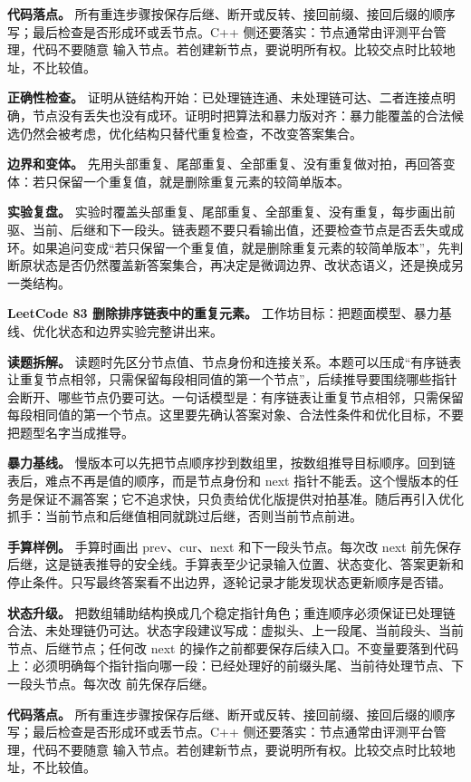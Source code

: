 \textbf{代码落点。} 所有重连步骤按保存后继、断开或反转、接回前缀、接回后缀的顺序写；最后检查是否形成环或丢节点。C++ 侧还要落实：节点通常由评测平台管理，代码不要随意  输入节点。若创建新节点，要说明所有权。比较交点时比较地址，不比较值。

\textbf{正确性检查。} 证明从链结构开始：已处理链连通、未处理链可达、二者连接点明确，节点没有丢失也没有成环。证明时把算法和暴力版对齐：暴力能覆盖的合法候选仍然会被考虑，优化结构只替代重复检查，不改变答案集合。

\textbf{边界和变体。} 先用头部重复、尾部重复、全部重复、没有重复做对拍，再回答变体：若只保留一个重复值，就是删除重复元素的较简单版本。

\textbf{实验复盘。} 实验时覆盖头部重复、尾部重复、全部重复、没有重复，每步画出前驱、当前、后继和下一段头。链表题不要只看输出值，还要检查节点是否丢失或成环。如果追问变成“若只保留一个重复值，就是删除重复元素的较简单版本”，先判断原状态是否仍然覆盖新答案集合，再决定是微调边界、改状态语义，还是换成另一类结构。

\noindent\textbf{LeetCode 83 删除排序链表中的重复元素。} 工作坊目标：把题面模型、暴力基线、优化状态和边界实验完整讲出来。

\textbf{读题拆解。} 读题时先区分节点值、节点身份和连接关系。本题可以压成“有序链表让重复节点相邻，只需保留每段相同值的第一个节点”，后续推导要围绕哪些指针会断开、哪些节点仍要可达。一句话模型是：有序链表让重复节点相邻，只需保留每段相同值的第一个节点。这里要先确认答案对象、合法性条件和优化目标，不要把题型名字当成推导。

\textbf{暴力基线。} 慢版本可以先把节点顺序抄到数组里，按数组推导目标顺序。回到链表后，难点不再是值的顺序，而是节点身份和 next 指针不能丢。这个慢版本的任务是保证不漏答案；它不追求快，只负责给优化版提供对拍基准。随后再引入优化抓手：当前节点和后继值相同就跳过后继，否则当前节点前进。

\textbf{手算样例。} 手算时画出 prev、cur、next 和下一段头节点。每次改 next 前先保存后继，这是链表推导的安全线。手算表至少记录输入位置、状态变化、答案更新和停止条件。只写最终答案看不出边界，逐轮记录才能发现状态更新顺序是否错。

\textbf{状态升级。} 把数组辅助结构换成几个稳定指针角色；重连顺序必须保证已处理链合法、未处理链仍可达。状态字段建议写成：虚拟头、上一段尾、当前段头、当前节点、后继节点；任何改 next 的操作之前都要保存后续入口。不变量要落到代码上：必须明确每个指针指向哪一段：已经处理好的前缀头尾、当前待处理节点、下一段头节点。每次改  前先保存后继。

\textbf{代码落点。} 所有重连步骤按保存后继、断开或反转、接回前缀、接回后缀的顺序写；最后检查是否形成环或丢节点。C++ 侧还要落实：节点通常由评测平台管理，代码不要随意  输入节点。若创建新节点，要说明所有权。比较交点时比较地址，不比较值。

